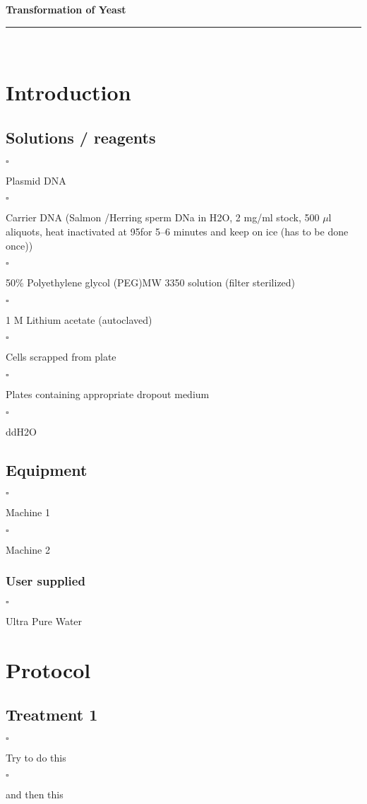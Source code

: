 \documentclass[a4paper,12pt]{article}
\newcommand{\protocol}{Transformation of Yeast}
\newcommand{\labtitle}{LAB TITLE}
\newcommand{\authorname}{YOURNAME}
\newenvironment{packed_enum}{
\begin{enumerate}
  \setlength{\itemsep}{1pt}
  \setlength{\parskip}{0pt}
  \setlength{\parsep}{0pt}
}{\end{enumerate}}
\newcommand{\checkbox}{$\square$\hspace{1mm}}
\newcommand{\icb}{\item \checkbox}
\begin{document}
 
 
 
\begin{titlepage}
\begin{center}
{\LARGE \textbf{\protocol} \\ \vspace{4pt}}
\rule[13pt]{\textwidth}{1pt} \\ \vspace{150pt}
\end{center}
 
\end{titlepage}
 
\newpage
\thispagestyle{empty}           %
\tableofcontents
\clearpage                      %
 
\setcounter{page}{1}
 
\section{Introduction}

	\subsection{Solutions / reagents}
			\begin{packed_enum}
				{\icb} Plasmid DNA
				{\icb} Carrier DNA (Salmon /Herring sperm DNa in H{\scriptsize2}O, 2 mg/ml stock, 500 $\mu$l aliquots, heat inactivated at 95\textcelsius for 5--6 minutes and keep on ice (has to be done once))
				{\icb} 50\% Polyethylene glycol (PEG)MW 3350 solution (filter sterilized)
				{\icb} 1 M Lithium acetate (autoclaved)
				{\icb} Cells scrapped from plate
				{\icb} Plates containing appropriate dropout medium
				{\icb} ddH{\scriptsize2}O
					\end{packed_enum}
	\subsection{Equipment}
			\begin{packed_enum}
				{\icb} Machine 1
				{\icb} Machine 2
			\end{packed_enum}
 
		\subsubsection{User supplied}
			\begin{packed_enum}
				{\icb} Ultra Pure Water
			\end{packed_enum}
\section{Protocol}
	\subsection{Treatment 1}
	\begin{enumerate}
		{\icb} Try to do this
		{\icb} and then this
	\end{enumerate}
\end{document}
